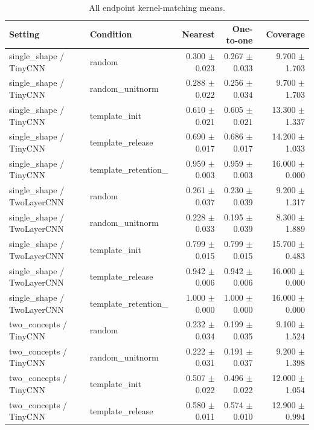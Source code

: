 \begin{landscape}
{\small
\setlength{\tabcolsep}{3pt}
\begin{longtable}{p{.28\linewidth}p{.24\linewidth}rrr}
\caption{All endpoint kernel-matching means.}\\
\toprule
Setting & Condition & Nearest & One-to-one & Coverage \\
\midrule
\endhead
\bottomrule
\endlastfoot
single\_\allowbreak shape / TinyCNN & random & 0.300 $\pm$ 0.023 & 0.267 $\pm$ 0.033 & 9.700 $\pm$ 1.703 \\
single\_\allowbreak shape / TinyCNN & random\_\allowbreak unitnorm & 0.288 $\pm$ 0.022 & 0.256 $\pm$ 0.034 & 9.700 $\pm$ 1.703 \\
single\_\allowbreak shape / TinyCNN & template\_\allowbreak init & 0.610 $\pm$ 0.021 & 0.605 $\pm$ 0.021 & 13.300 $\pm$ 1.337 \\
single\_\allowbreak shape / TinyCNN & template\_\allowbreak release & 0.690 $\pm$ 0.017 & 0.686 $\pm$ 0.017 & 14.200 $\pm$ 1.033 \\
single\_\allowbreak shape / TinyCNN & template\_\allowbreak retention\_\allowbreak 1 & 0.959 $\pm$ 0.003 & 0.959 $\pm$ 0.003 & 16.000 $\pm$ 0.000 \\
single\_\allowbreak shape / TwoLayerCNN & random & 0.261 $\pm$ 0.037 & 0.230 $\pm$ 0.039 & 9.200 $\pm$ 1.317 \\
single\_\allowbreak shape / TwoLayerCNN & random\_\allowbreak unitnorm & 0.228 $\pm$ 0.033 & 0.195 $\pm$ 0.039 & 8.300 $\pm$ 1.889 \\
single\_\allowbreak shape / TwoLayerCNN & template\_\allowbreak init & 0.799 $\pm$ 0.015 & 0.799 $\pm$ 0.015 & 15.700 $\pm$ 0.483 \\
single\_\allowbreak shape / TwoLayerCNN & template\_\allowbreak release & 0.942 $\pm$ 0.006 & 0.942 $\pm$ 0.006 & 16.000 $\pm$ 0.000 \\
single\_\allowbreak shape / TwoLayerCNN & template\_\allowbreak retention\_\allowbreak 1 & 1.000 $\pm$ 0.000 & 1.000 $\pm$ 0.000 & 16.000 $\pm$ 0.000 \\
two\_\allowbreak concepts / TinyCNN & random & 0.232 $\pm$ 0.034 & 0.199 $\pm$ 0.035 & 9.100 $\pm$ 1.524 \\
two\_\allowbreak concepts / TinyCNN & random\_\allowbreak unitnorm & 0.222 $\pm$ 0.031 & 0.191 $\pm$ 0.037 & 9.200 $\pm$ 1.398 \\
two\_\allowbreak concepts / TinyCNN & template\_\allowbreak init & 0.507 $\pm$ 0.022 & 0.496 $\pm$ 0.022 & 12.000 $\pm$ 1.054 \\
two\_\allowbreak concepts / TinyCNN & template\_\allowbreak release & 0.580 $\pm$ 0.011 & 0.574 $\pm$ 0.010 & 12.900 $\pm$ 0.994 \\

\end{longtable}}
\end{landscape}
